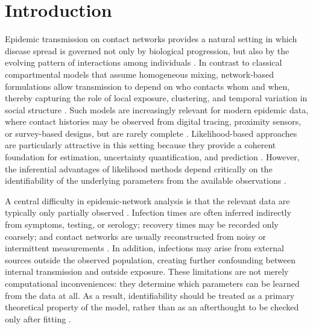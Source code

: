 \documentclass[10pt]{article}
\begin{document}
\section{Introduction}
Epidemic transmission on contact networks provides a natural setting in which disease spread is governed not only by biological progression, but also by the evolving pattern of interactions among individuals \citep{danon2011networks, bansal2010dynamic}. In contrast to classical compartmental models that assume homogeneous mixing, network-based formulations allow transmission to depend on who contacts whom and when, thereby capturing the role of local exposure, clustering, and temporal variation in social structure \citep{vecherin2026infection}. Such models are increasingly relevant for modern epidemic data, where contact histories may be observed from digital tracing, proximity sensors, or survey-based designs, but are rarely complete \cite{pellis2015eight}. Likelihood-based approaches are particularly attractive in this setting because they provide a coherent foundation for estimation, uncertainty quantification, and prediction \citep{breto2018modeling, tonsing2018profile, bu2022likelihood, abed2026spatial}. However, the inferential advantages of likelihood methods depend critically on the identifiability of the underlying parameters from the available observations \citep{bu2022likelihood, lam2022practical}.

A central difficulty in epidemic-network analysis is that the relevant data are typically only partially observed \citep{black2019importance, bu2022likelihood, kamkumo2025estimating}. Infection times are often inferred indirectly from symptoms, testing, or serology; recovery times may be recorded only coarsely; and contact networks are usually reconstructed from noisy or intermittent measurements \citep{eames2015six}. In addition, infections may arise from external sources outside the observed population, creating further confounding between internal transmission and outside exposure. These limitations are not merely computational inconveniences: they determine which parameters can be learned from the data at all. As a result, identifiability should be treated as a primary theoretical property of the model, rather than as an afterthought to be checked only after fitting \citep{lam2022practical, preston2025think}.
\end{document}
